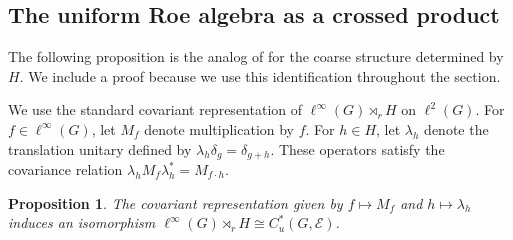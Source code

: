 \documentclass[pdflatex,sn-mathphys-num]{sn-jnl}%
\theoremstyle{plain}
\newtheorem{proposition}[theorem]{Proposition}
\theoremstyle{remark}
\theoremstyle{definition}
\numberwithin{equation}{section}
\begin{document}
\subsection{The uniform Roe algebra as a crossed product}

The following proposition is the analog of \cite[Proposition~5.1.3]{roe2003lectures} for the coarse structure determined by \( H \). We include a proof because we use this identification throughout the section.

We use the standard covariant representation of \( \ell^\infty(G)\rtimes_rH \) on \( \ell^2(G) \). For \( f\in\ell^\infty(G) \), let \( M_f \) denote multiplication by \( f \). For \( h\in H \), let \( \lambda_h \) denote the translation unitary defined by \( \lambda_h\delta_g=\delta_{g+h} \). These operators satisfy the covariance relation \( \lambda_hM_f\lambda_h^*=M_{f\cdot h} \).

\begin{proposition}
\label{prop:uniform-roe-crossed-product}
The covariant representation given by \( f\mapsto M_f \) and \( h\mapsto\lambda_h \) induces an isomorphism \( \ell^\infty(G)\rtimes_rH\cong C_u^*(G,\mathcal E) \).
\end{proposition}
\end{document}

